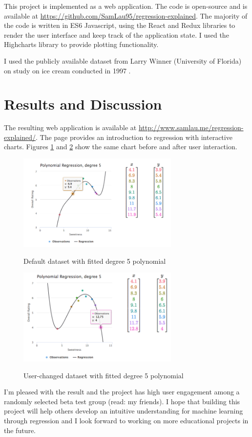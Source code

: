 \documentclass{acm_proc_article-sp}
\begin{document}
This project is implemented as a web application. The code is open-source and
is available at \url{https://github.com/SamLau95/regression-explained}. The
majority of the code is written in ES6 Javascript, using the React
\cite{ReactAJa96:online} and Redux \cite{reactjsr26:online} libraries to render
the user interface and keep track of the application state. I used the
Highcharts \cite{Interact47:online} library to provide plotting functionality.

I used the publicly available dataset from Larry Winner (University of
Florida) on study on ice cream conducted in 1997 \cite{datasets42:online}
\cite{guinard1997sugar}.

\section{Results and Discussion}

The resulting web application is available at
\url{http://www.samlau.me/regression-explained/}. The page provides an
introduction to regression with interactive charts. Figures \ref{fig:app1} and
\ref{fig:app2} show the same chart before and after user interaction.

\begin{figure}[h]
\caption{Default dataset with fitted degree 5 polynomial}
\includegraphics[width=8cm]{images/app1.png}
\label{fig:app1}
\end{figure}

\begin{figure}[h]
\caption{User-changed dataset with fitted degree 5 polynomial}
\includegraphics[width=8cm]{images/app2.png}
\label{fig:app2}
\end{figure}

I'm pleased with the result and the project has high user engagement among a
randomly selected beta test group (read: my friends). I hope that building this
project will help others develop an intuitive understanding for machine
learning through regression and I look forward to working on more educational
projects in the future.




\end{document}
